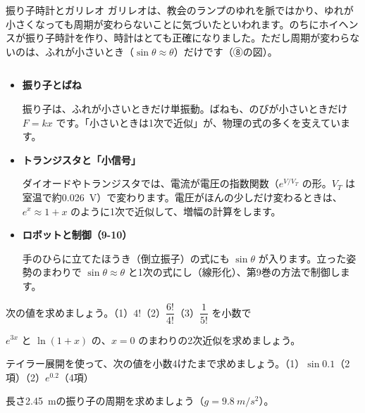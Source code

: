 \begin{column}{振り子時計とガリレオ}
ガリレオは、教会のランプのゆれを脈ではかり、ゆれが小さくなっても周期が変わらないことに気づいたといわれます。のちにホイヘンスが振り子時計を作り、時計はとても正確になりました。ただし周期が変わらないのは、ふれが小さいとき（$\sin\theta\approx\theta$）だけです（⑧の図）。
\end{column}

\begin{butsuri}
\begin{itemize}[leftmargin=1.2\zw, itemsep=1pt, topsep=0pt, label={\color{bkPurple}●}]
\item \textbf{振り子とばね}\par\noindent 振り子は、ふれが小さいときだけ単振動。ばねも、のびが小さいときだけ $F=kx$ です。「小さいときは1次で近似」が、物理の式の多くを支えています。
\item \textbf{トランジスタと「小信号」}\par\noindent ダイオードやトランジスタでは、電流が電圧の指数関数（$e^{V/V_T}$ の形。$V_T$ は室温で約\qty{0.026}{V}）で変わります。電圧がほんの少しだけ変わるときは、$e^x\approx1+x$ のように1次で近似して、増幅の計算をします。
\item \textbf{ロボットと制御（9-10）}\par\noindent 手のひらに立てたほうき（倒立振子）の式にも $\sin\theta$ が入ります。立った姿勢のまわりで $\sin\theta\approx\theta$ と1次の式にし（線形化）、第9巻の方法で制御します。
\end{itemize}
\end{butsuri}

\bkendproblems
{}

\bkproblem 次の値を求めましょう。\quad（1）$4!$\quad（2）$\dfrac{6!}{4!}$\quad（3）$\dfrac{1}{5!}$ を小数で

\bkproblem $e^{3x}$ と $\ln(1+x)$ の、$x=0$ のまわりの2次近似を求めましょう。

\bkproblem テイラー展開を使って、次の値を小数4けたまで求めましょう。\newline（1）$\sin0.1$（2項）\quad（2）$e^{0.2}$（4項）

\bkproblem 長さ\qty{2.45}{m}の振り子の周期を求めましょう（$g=\qty{9.8}{m/s^2}$）。

